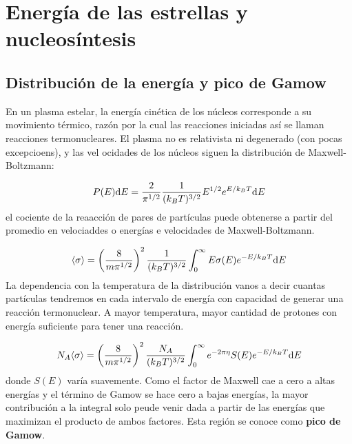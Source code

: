 
\section{Energía de las estrellas y nucleosíntesis}

\subsection{Distribución de la energía y pico de Gamow}

En un plasma estelar, la energía cinética de los núcleos corresponde a su movimiento térmico, razón por la cual las reacciones iniciadas así se llaman reacciones termonucleares. El plasma no es relativista ni degenerado (con pocas excepcioens), y las vel ocidades de los núcleos siguen la distribución de Maxwell-Boltzmann:

\begin{equation}
	P(E) \mathrm{d} E = \frac{2}{\pi^{1/2}}  \frac{1}{(k_BT)^{3/2}} E^{1/2} e^{E/k_BT}\mathrm{d} E
\end{equation}
el cociente de la reaacción de pares de partículas puede obtenerse a partir del promedio en velociaddes o energías e velocidades de Maxwell-Boltzmann.

\begin{equation}
	\langle \sigma \rangle = \left( \frac{8}{m\pi^{1/2}} \right)^2 \frac{1}{(k_BT)^{3/2}} \int_{0}^{\infty} E \sigma (E) e^{-E/k_BT} \mathrm{d} E
\end{equation}
La dependencia con la temperatura de la distribución vanos a decir cuantas partículas tendremos en cada intervalo de energía con capacidad de generar una reacción termonuclear. A mayor temperatura, mayor cantidad de protones con energía suficiente para tener una reacción.

\begin{equation}
	N_A \langle \sigma \rangle = \left( \frac{8}{m\pi^{1/2}} \right)^2 \frac{N_A}{(k_BT)^{3/2}} \int_{0}^{\infty} e^{-2\pi  \eta} S(E) e^{-E/k_BT} \mathrm{d} E
\end{equation}
donde $S(E)$ varía suavemente. Como el factor de Maxwell cae a cero a altas energías y el término de Gamow se hace cero a bajas energías, la mayor contribución a la integral solo peude venir dada a partir de las energías que maximizan el producto de ambos factores. Esta región se conoce como \textbf{pico de Gamow}.

